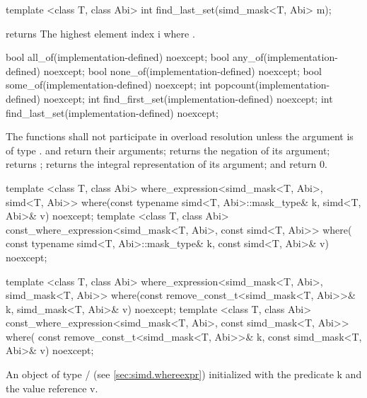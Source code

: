 \begin{itemdecl}
template <class T, class Abi> int find_last_set(simd_mask<T, Abi> m);
\end{itemdecl}
\begin{itemdescr}
  \pnum\requires {} returns \true
  \pnum\returns The highest element index \code i where .
\end{itemdescr}

\begin{itemdecl}
bool  all_of(implementation-defined) noexcept;
bool  any_of(implementation-defined) noexcept;
bool none_of(implementation-defined) noexcept;
bool some_of(implementation-defined) noexcept;
int popcount(implementation-defined) noexcept;
int find_first_set(implementation-defined) noexcept;
int find_last_set(implementation-defined) noexcept;
\end{itemdecl}
\begin{itemdescr}
  \pnum\remarks The functions shall not participate in overload resolution unless the argument is of type \bool.
  \pnum\returns {} and  return their arguments;  returns the negation of its argument;  returns \false;  returns the integral representation of its argument;  and  return 0.
\end{itemdescr}

\begin{itemdecl}
template <class T, class Abi>
where_expression<simd_mask<T, Abi>, simd<T, Abi>> where(const typename simd<T, Abi>::mask_type& k,
                                                        simd<T, Abi>& v) noexcept;
template <class T, class Abi>
const_where_expression<simd_mask<T, Abi>, const simd<T, Abi>> where(
    const typename simd<T, Abi>::mask_type& k, const simd<T, Abi>& v) noexcept;

template <class T, class Abi>
where_expression<simd_mask<T, Abi>, simd_mask<T, Abi>> where(const remove_const_t<simd_mask<T, Abi>>& k,
                                                             simd_mask<T, Abi>& v) noexcept;
template <class T, class Abi>
const_where_expression<simd_mask<T, Abi>, const simd_mask<T, Abi>> where(
    const remove_const_t<simd_mask<T, Abi>>& k, const simd_mask<T, Abi>& v) noexcept;
\end{itemdecl}
\begin{itemdescr}
  \pnum\returns An object of type / (see \ref{sec:simd.whereexpr}) initialized with the predicate \code k and the value reference \code v.
\end{itemdescr}

